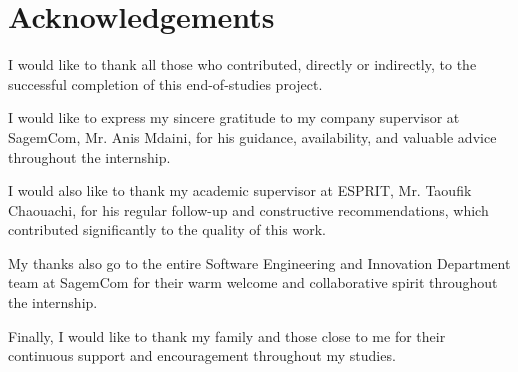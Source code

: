 \chapter*{Acknowledgements}

I would like to thank all those who contributed, directly or indirectly, to the successful completion of this end-of-studies project.

I would like to express my sincere gratitude to my company supervisor at SagemCom, Mr. Anis Mdaini, for his guidance, availability, and valuable advice throughout the internship.

I would also like to thank my academic supervisor at ESPRIT, Mr. Taoufik Chaouachi, for his regular follow-up and constructive recommendations, which contributed significantly to the quality of this work.

My thanks also go to the entire Software Engineering and Innovation Department team at SagemCom for their warm welcome and collaborative spirit throughout the internship.

Finally, I would like to thank my family and those close to me for their continuous support and encouragement throughout my studies.
